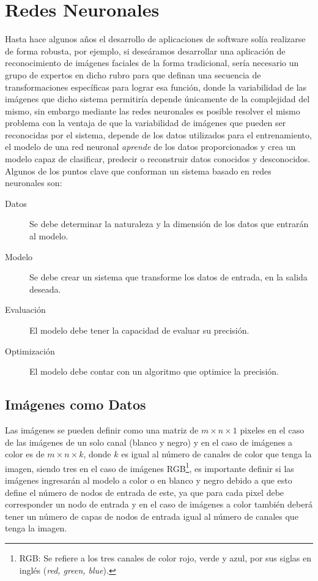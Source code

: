 \section{Redes Neuronales}

Hasta hace algunos años el desarrollo de aplicaciones de software solía realizarse de forma robusta, por ejemplo, si deseáramos desarrollar una aplicación de reconocimiento de imágenes faciales de la forma tradicional, sería necesario un grupo de expertos en dicho rubro para que definan una secuencia de transformaciones específicas para lograr esa función, donde la variabilidad de las imágenes que dicho sistema permitiría depende únicamente de la complejidad del mismo, sin embargo mediante las redes neuronales es posible resolver el mismo problema con la ventaja de que la variabilidad de imágenes que pueden ser reconocidas por el sistema, depende de los datos utilizados para el entrenamiento, el modelo de una red neuronal \emph{aprende} de los datos proporcionados y crea un modelo capaz de clasificar, predecir o reconstruir datos conocidos y desconocidos. Algunos de los puntos clave que conforman un sistema basado en redes neuronales son:

\begin{description}
    \item[Datos]{Se debe determinar la naturaleza y la dimensión de los datos que entrarán al modelo.}
    \item[Modelo] {Se debe crear un sistema que transforme los datos de entrada, en la salida deseada.}
    \item[Evaluación] {El modelo debe tener la capacidad de evaluar su precisión.}
    \item[Optimización] {El modelo debe contar con un algoritmo que optimice la precisión.}
\end{description}

\subsection{Imágenes como Datos}
Las imágenes se pueden definir como una matriz de $m \times n \times 1$ pixeles en el caso de las imágenes de un solo canal (blanco y negro) y en el caso de imágenes a color es de $m \times n \times k$, donde $k$ es igual al número de canales de color que tenga la imagen, siendo tres en el caso de imágenes RGB\footnote{RGB: Se refiere a los tres canales de color rojo, verde y azul, por sus siglas en inglés (\emph{red, green, blue}).}, es importante definir si las imágenes ingresarán al modelo a color o en blanco y negro debido a que esto define el número de nodos de entrada de este, ya que para cada pixel debe corresponder un nodo de entrada y en el caso de imágenes a color también deberá tener un número de capas de nodos de entrada igual al número de canales que tenga la imagen.


